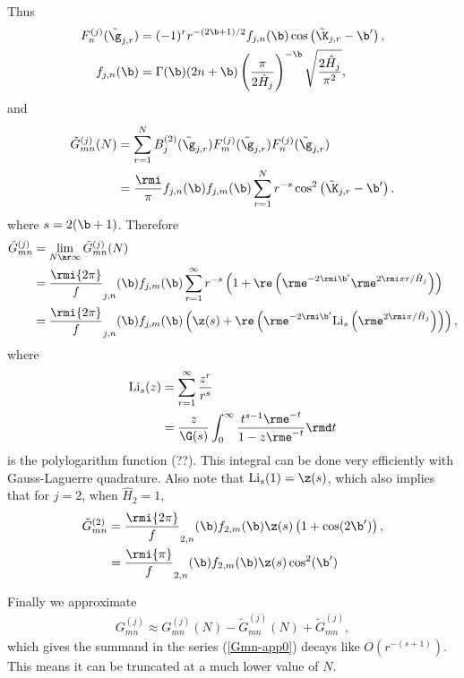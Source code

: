 \documentclass[a4paper,10pt]{article}
\begin{document}
Thus
\begin{subequations}
\begin{align}
F_n^{(j)}(\tilde \g_{j,r})&=
(-1)^{r}r^{-(2\b+1)/2}f_{j,n}(\b)\cos\left(\tilde\K_{j,r}-\b'\right),\\
f_{j,n}(\b)&=\Gamma(\b)(2n+\b)\left(\frac\pi{2\hat H_{j}}\right)^{-\b}
\sqrt{\frac{2\hat H_{j}}{\pi^{2} }},
\end{align}
\end{subequations}
and
\begin{align}\label{Gmn-app0}
\tilde G_{mn}^{(j)}(N)
 &=\sum_{r=1}^{N}B_j^{(2)}(\tilde\g_{j,r})F_m^{(j)}(\tilde\g_{j,r})F^{(j)}_n(\tilde\g_{j,r})
 \notag\\
 &=\frac\rmi\pi f_{j,n}(\b)f_{j,m}(\b)\sum_{r=1}^{N}r^{-s}
 \cos^{2}\left(\tilde\K_{j,r}-\b'\right).
 \end{align}
where $s=2(\b+1)$.
Therefore
\begin{align}\label{Gmn-app}
\tilde G_{mn}^{(j)}
&=\lim_{N\ar\infty}\tilde G_{mn}^{(j)}(N)
\notag\\
 &=\frac\rmi{2\pi} f_{j,n}(\b)f_{j,m}(\b)\sum_{r=1}^{\infty}r^{-s}
 \left (1+\re\left (\rme^{-2\rmi\b'} \rme^{2\rmi\pi r/\hat H_{j}}\right)\right)
\notag\\
 &=\frac\rmi{2\pi} f_{j,n}(\b)f_{j,m}(\b)
 \left ( \z(s)+\re\left (\rme^{-2\rmi\b'}{\rm Li}_{s} \left(\rme^{2\rmi\pi /\hat H_{j}}\right)\right)\right),
 \end{align}
 where
\begin{align}
{\rm Li}_{s}(z)&=\sum_{r=1}^{\infty}\frac{z^{r}}{r^{s}}
\notag\\
&=\frac{z}{\G(s)}\int_{0}^{\infty}\frac{t^{s-1}\rme^{-t}}{1-z\rme^{-t}}\rmd t
\end{align}
is the polylogarithm function (??). This integral can be done very efficiently with Gauss-Laguerre quadrature. Also note that ${\rm Li}_{s}(1)=\z(s)$, which also implies that for $j=2$, when $\hat H_{2}=1$,
\begin{align}\label{Gmn-app}
\tilde G_{mn}^{(2)}
&=\frac\rmi{2\pi} f_{2,n}(\b)f_{2,m}(\b)\z(s)
 \left ( 1+\cos(2\b')\right),
 \notag\\
 &=\frac\rmi{\pi} f_{2,n}(\b)f_{2,m}(\b)\z(s)\cos^{2}(\b')
 \end{align}
 
 Finally we approximate
 \begin{align}
G_{mn}^{(j)}\approx G_{mn}^{(j)}(N)-\tilde G_{mn}^{(j)}(N)+ \tilde G_{mn}^{(j)},
\end{align}
which gives the summand in the series (\ref{Gmn-app0}) decays like $O(r^{-(s+1)})$.
This means it can be truncated at a much lower value of $N$.%



\end{document}
